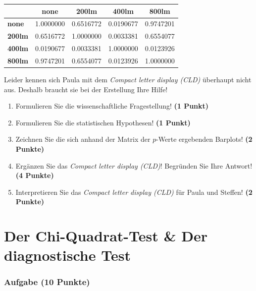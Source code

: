 \documentclass[a4paper, 9pt]{scrartcl}\usepackage[]{graphicx}\usepackage[]{xcolor}
\newenvironment{knitrout}{}{} %
\begin{document}
\begin{knitrout}
\color{fgcolor}\begin{table}[!h]
\centering\begingroup\fontsize{10}{12}\selectfont

\begin{tabular}{>{}lcccc}
\toprule
\textbf{ } & \textbf{none} & \textbf{200lm} & \textbf{400lm} & \textbf{800lm}\\
\midrule
\textbf{none} & 1.0000000 & 0.6516772 & 0.0190677 & 0.9747201\\
\textbf{200lm} & 0.6516772 & 1.0000000 & 0.0033381 & 0.6554077\\
\textbf{400lm} & 0.0190677 & 0.0033381 & 1.0000000 & 0.0123926\\
\textbf{800lm} & 0.9747201 & 0.6554077 & 0.0123926 & 1.0000000\\
\bottomrule
\end{tabular}
\endgroup{}
\end{table}

\end{knitrout}

Leider kennen sich Paula mit dem \textit{Compact letter display (CLD)} überhaupt nicht aus. Deshalb braucht sie bei der Erstellung Ihre Hilfe!

\begin{enumerate}
  \item Formulieren Sie die wissenschaftliche Fragestellung! \textbf{(1 Punkt)}
  \item Formulieren Sie die statistischen Hypothesen! \textbf{(1 Punkt)}
\item Zeichnen Sie die sich anhand der Matrix der $p$-Werte ergebenden Barplots! \textbf{(2 Punkte)}
\item Ergänzen Sie das \textit{Compact letter display (CLD)}! Begründen Sie Ihre Antwort! \textbf{(4 Punkte)}
\item Interpretieren Sie das \textit{Compact letter display (CLD)} für Paula und Steffen! \textbf{(2 Punkte)} 
\end{enumerate}

 
\clearpage
\part{Der Chi-Quadrat-Test \& Der diagnostische Test}

\section{Aufgabe \hfill (10 Punkte)}
\end{document}

